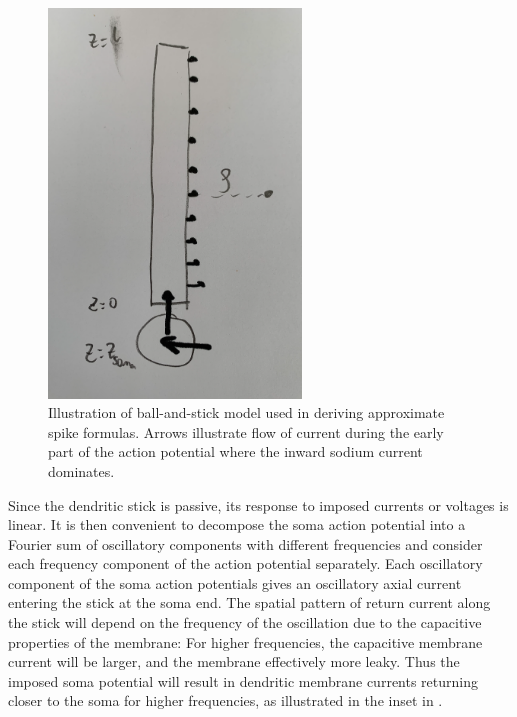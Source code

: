 \begin{figure}[!ht]
\begin{center}
\includegraphics[width=0.6\textwidth]{Figures/Spikes/Spikes-ball-and-stick-model-sketch}
\end{center}
\caption[]{Illustration of ball-and-stick model used in deriving approximate spike formulas.
Arrows illustrate flow of current during the early part of the action potential where the 
inward sodium current dominates.}
\label{fig:Spikes:ball-and-stick-model-sketch}
\end{figure}

Since the dendritic stick is passive, its response to imposed currents or voltages is linear.  
It is then convenient to decompose the soma action potential into a Fourier sum of oscillatory components with different 
frequencies and consider each frequency component of the action potential separately. 
Each oscillatory component of the soma action potentials gives an oscillatory axial current entering the stick at the soma end. The spatial pattern of return current along the stick will depend on the frequency of the oscillation 
due to the capacitive properties of the membrane: 
For higher frequencies, the capacitive membrane current will be larger, 
and the membrane effectively more leaky. 
Thus the imposed soma potential will result in dendritic membrane currents returning closer to the soma for higher frequencies, 
as illustrated in the inset in .  

